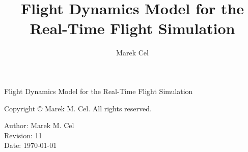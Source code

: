 \documentclass[12pt,a4paper]{report}
\title{Flight Dynamics Model for the Real-Time Flight Simulation}
\author{Marek Cel}
\date{}
\begin{document}
  
  \begin{titlepage}
    \centering
    {\huge Flight Dynamics Model for the Real-Time Flight Simulation\par}
  \end{titlepage}
  

  \noindent Copyright \copyright{} \the\year{} Marek M. Cel. All rights reserved.

  \noindent Author: Marek M. Cel \\
  Revision: 11 \\
  Date: \today

  
  
  {
    \clearpage
    \setlength{\parskip}{0em}
    \tableofcontents
  }

  
  
  
  
  
  
  
  
  
  \clearpage
   
  
  
\end{document}
